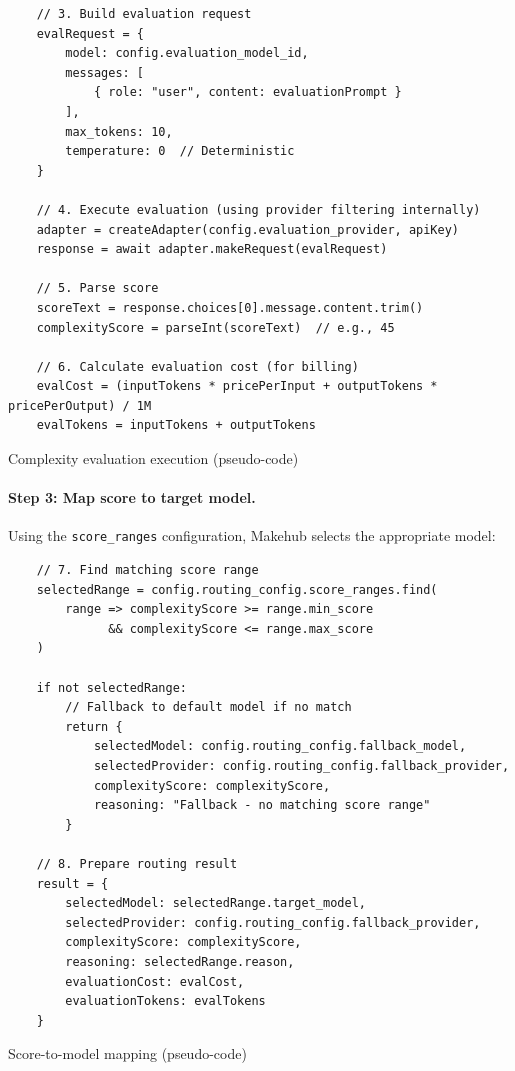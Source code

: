 \documentclass[english]{article}
\begin{document}
\begin{listing}[H]
\begin{verbatim}
    // 3. Build evaluation request
    evalRequest = {
        model: config.evaluation_model_id,
        messages: [
            { role: "user", content: evaluationPrompt }
        ],
        max_tokens: 10,
        temperature: 0  // Deterministic
    }

    // 4. Execute evaluation (using provider filtering internally)
    adapter = createAdapter(config.evaluation_provider, apiKey)
    response = await adapter.makeRequest(evalRequest)

    // 5. Parse score
    scoreText = response.choices[0].message.content.trim()
    complexityScore = parseInt(scoreText)  // e.g., 45

    // 6. Calculate evaluation cost (for billing)
    evalCost = (inputTokens * pricePerInput + outputTokens * pricePerOutput) / 1M
    evalTokens = inputTokens + outputTokens
\end{verbatim}
\caption{Complexity evaluation execution (pseudo-code)}
\end{listing}

\paragraph{Step 3: Map score to target model.}

Using the \texttt{score\_ranges} configuration, Makehub selects the appropriate model:

\begin{listing}[H]
\begin{verbatim}
    // 7. Find matching score range
    selectedRange = config.routing_config.score_ranges.find(
        range => complexityScore >= range.min_score
              && complexityScore <= range.max_score
    )

    if not selectedRange:
        // Fallback to default model if no match
        return {
            selectedModel: config.routing_config.fallback_model,
            selectedProvider: config.routing_config.fallback_provider,
            complexityScore: complexityScore,
            reasoning: "Fallback - no matching score range"
        }

    // 8. Prepare routing result
    result = {
        selectedModel: selectedRange.target_model,
        selectedProvider: config.routing_config.fallback_provider,
        complexityScore: complexityScore,
        reasoning: selectedRange.reason,
        evaluationCost: evalCost,
        evaluationTokens: evalTokens
    }
\end{verbatim}
\caption{Score-to-model mapping (pseudo-code)}
\end{listing}
\end{document}
